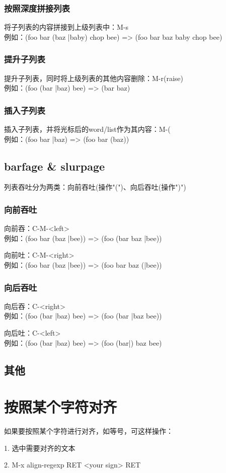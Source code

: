 ﻿\documentclass[a4paper,11pt]{article}
\begin{document}
  \subsubsection[按照深度拼接列表]{按照深度拼接列表}
  将子列表的内容拼接到上级列表中：M-s\\
  例如：(foo bar (baz |baby) chop bee) => (foo bar baz baby chop bee)

  \subsubsection[提升子列表]{提升子列表}
  提升子列表，同时将上级列表的其他内容删除：M-r(raise)\\
  例如：(foo (bar |baz) bee) => (bar baz)

  \subsubsection[插入子列表]{插入子列表}
  插入子列表，并将光标后的word/list作为其内容：M-(\\
  例如：(foo bar |baz) => (foo bar (baz))

  \subsection[barfage \& slurpage]{barfage \& slurpage}
  列表吞吐分为两类：向前吞吐(操作"(")、向后吞吐(操作")")\\
  \subsubsection[向前吞吐]{向前吞吐}
  向前吞：C-M-<left>\\
  例如：(foo bar (baz |bee)) => (foo (bar baz |bee))
  
  向前吐：C-M-<right>\\
  例如：(foo bar (baz |bee)) => (foo bar baz (|bee))
  \subsubsection[向后吞吐]{向后吞吐}
  向后吞：C-<right>\\
  例如：(foo (bar |baz) bee) => (foo (bar |baz bee))

  向后吐：C-<left>\\
  例如：(foo (bar |baz) bee) => (foo (bar|) baz bee)
  
  \subsection[其他]{其他}


  \section[按照某个字符对齐]{按照某个字符对齐}
  如果要按照某个字符进行对齐，如等号，可这样操作：

  1. 选中需要对齐的文本

  2. M-x align-regexp RET <your sign> RET


  
  
\end{document}
